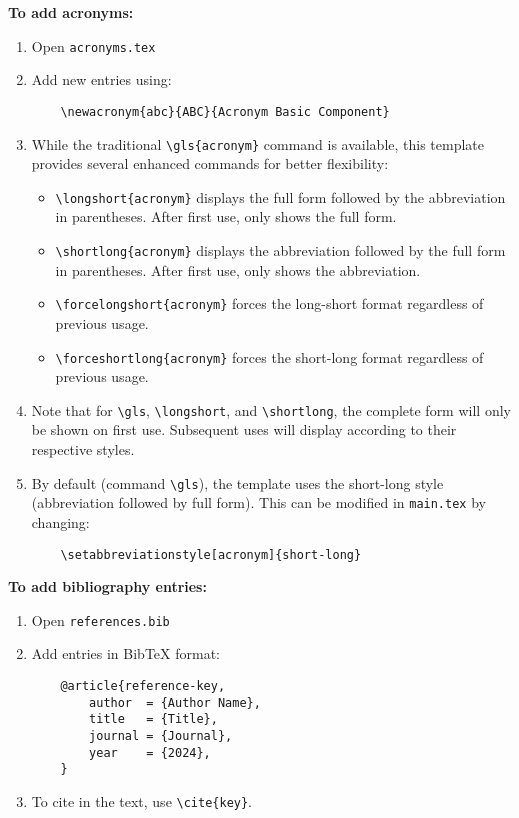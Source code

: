 \textbf{To add acronyms:}
\begin{enumerate}
    \item Open \texttt{acronyms.tex}
    \item Add new entries using:
    \begin{verbatim}
    \newacronym{abc}{ABC}{Acronym Basic Component}
    \end{verbatim}
    \item While the traditional \verb|\gls{acronym}| command is available, this template provides several enhanced commands for better flexibility:
    \begin{itemize}
        \item \verb|\longshort{acronym}| displays the full form followed by the abbreviation in parentheses. After first use, only shows the full form.
        \item \verb|\shortlong{acronym}| displays the abbreviation followed by the full form in parentheses. After first use, only shows the abbreviation.
        \item \verb|\forcelongshort{acronym}| forces the long-short format regardless of previous usage.
        \item \verb|\forceshortlong{acronym}| forces the short-long format regardless of previous usage.
    \end{itemize}
    \item Note that for \verb|\gls|, \verb|\longshort|, and \verb|\shortlong|, the complete form will only be shown on first use. Subsequent uses will display according to their respective styles.
    \item By default (command \verb|\gls|), the template uses the short-long style (abbreviation followed by full form). This can be modified in \texttt{main.tex} by changing:
    \begin{verbatim}
    \setabbreviationstyle[acronym]{short-long}
    \end{verbatim}
\end{enumerate}

\textbf{To add bibliography entries:}
\begin{enumerate}
    \item Open \texttt{references.bib}
    \item Add entries in BibTeX format:
    \begin{verbatim}
    @article{reference-key,
        author  = {Author Name},
        title   = {Title},
        journal = {Journal},
        year    = {2024},
    }
    \end{verbatim}
    \item To cite in the text, use \verb|\cite{key}|.
\end{enumerate}

